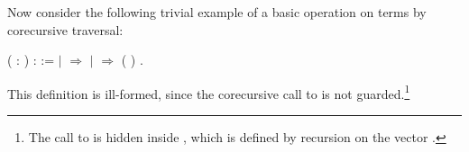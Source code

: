 Now consider the following trivial example of a basic operation on terms by
corecursive traversal:
\begin{singlespace}
\begin{coqdoccode}
\coqdocnoindent
{} 
( : ) :
 :=\coqdoceol
\coqdocindent{1.00em}
  \coqdoceol
\coqdocindent{1.00em}
\ensuremath{|}  
\ensuremath{\Rightarrow} 
\coqdoceol
\coqdocindent{1.00em}
\ensuremath{|}  
 \ensuremath{\Rightarrow}
 
( 
)\coqdoceol
\coqdocindent{1.00em}
.\coqdoceol
\end{coqdoccode}
\end{singlespace}
This definition is ill-formed, since the corecursive call to
 is not guarded.\footnote{The call to
   is hidden inside
  , which is defined by recursion on the vector
  .}


